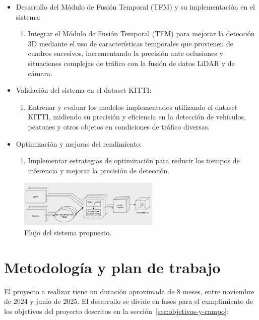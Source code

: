 \begin{itemize}
	\item Desarrollo del Módulo de Fusión Temporal (TFM) y su implementación en el sistema:
	\begin{enumerate}
		\item Integrar el Módulo de Fusión Temporal (TFM) para mejorar la detección 3D mediante el uso de características temporales que provienen de cuadros sucesivos, incrementando la precisión ante oclusiones y situaciones complejas de tráfico con la fusión de datos LiDAR y de cámara.
	\end{enumerate}
	
	\item Validación del sistema en el dataset KITTI:
	\begin{enumerate}
		\item Entrenar y evaluar los modelos implementados utilizando el dataset KITTI, midiendo su precisión y eficiencia en la detección de vehículos, peatones y otros objetos en condiciones de tráfico diversas.
	\end{enumerate}
	
	\item Optimización y mejoras del rendimiento:
	\begin{enumerate}
		\item Implementar estrategias de optimización para reducir los tiempos de inferencia y mejorar la precisión de detección.
	\end{enumerate}
	
\end{itemize}

\begin{figure}[hbtp]
	\centering
	\includegraphics[width=0.6\textwidth]{flujo.png}
	\caption{Flujo del sistema propuesto.}
	\label{fig:flujo_sistema}
\end{figure}



\section{Metodología y plan de trabajo}
\label{sec:metodologia-y-plan}

El proyecto a realizar tiene un duración aproximada de 8 meses, entre noviembre de 2024 y junio de 2025. El desarrollo se divide en fases para el cumplimiento de los objetivos del proyecto descritos en la sección~\ref{sec:objetivos-y-campo}:

